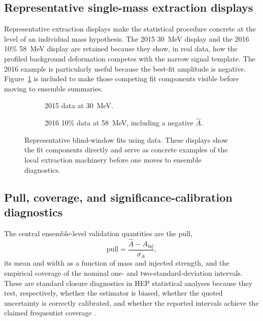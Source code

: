\subsection{Representative single-mass extraction displays}

Representative extraction displays make the statistical procedure concrete at the level
of an individual mass hypothesis. The 2015 \SI{30}{MeV} display and the 2016 10\%
\SI{58}{MeV} display are retained because they show, in real data, how the profiled
background deformation competes with the narrow signal template. The 2016 example is
particularly useful because the best-fit amplitude is negative.
Figure~\ref{fig:data-fit-examples} is included to make those competing fit components
visible before moving to ensemble summaries.

\begin{figure}[p]
\centering
\begin{subfigure}[t]{0.88\linewidth}
  \centering
  \caption{2015 data at \SI{30}{MeV}.}
\end{subfigure}

\vspace{1.0em}

\begin{subfigure}[t]{0.88\linewidth}
  \centering
  \caption{2016 10\% data at \SI{58}{MeV}, including a negative $\hat A$.}
\end{subfigure}
\caption{Representative blind-window fits using data. These displays show the fit
components directly and serve as concrete examples of the local extraction machinery
before one moves to ensemble diagnostics.}
\label{fig:data-fit-examples}
\end{figure}

\subsection{Pull, coverage, and significance-calibration diagnostics}

The central ensemble-level validation quantities are the pull,
\begin{equation}
\mathrm{pull} = \frac{\hat A - A_{\mathrm{inj}}}{\sigma_A},
\end{equation}
its mean and width as a function of mass and injected strength, and the empirical
coverage of the nominal one- and two-standard-deviation intervals. These are standard
closure diagnostics in HEP statistical analyses because they test, respectively,
whether the estimator is biased, whether the quoted uncertainty is correctly calibrated,
and whether the reported intervals achieve the claimed frequentist coverage
\cite{Cowan1998,Cowan2011}.

